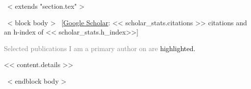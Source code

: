 ~< extends "section.tex" >~

~< block body >~
\vspace{-8.2mm}\hspace{30mm}[\href{https://scholar.google.com/citations?user=<< scholar_id >>}{Google Scholar}: << scholar_stats.citations >> citations and an h-index of << scholar_stats.h_index>>]\vspace{3mm}

\setlength\fboxsep{2pt}
\textcolor{gray}{Selected publications I am a primary author on are
\hspace{-\fboxsep}\colorbox{tab_highlight}{\textcolor{black}{highlighted.}}}




<< content.details >>

~< endblock body >~
